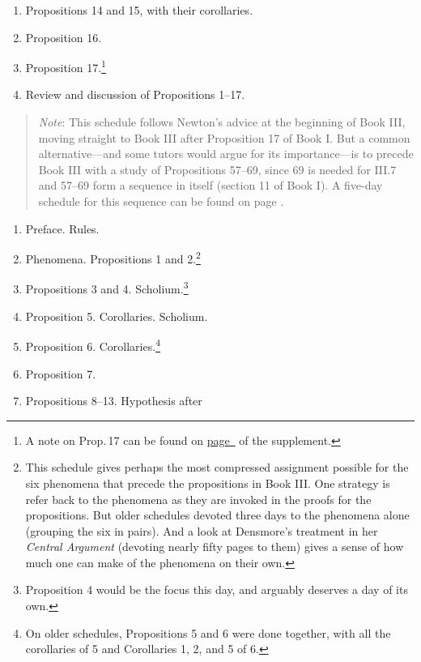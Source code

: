 \documentclass[10pt]{article}
\begin{document}
{\begin{enumerate}[resume*]
{			found on \hyperref[supple.96]{page~\pageref{supple.96}} and \hyperref[supple.98]{\pageref{supple.98}} of the supplement.} \item Propositions
		14 and 15, with their corollaries.  \item
		Proposition 16.  \item Proposition 17.\footnote{A
		note on Prop.\,17 can be found on \hyperref[supple.99]{page~\pageref{supple.99}} of the supplement.}
	\item Review and discussion of Propositions 1--17.
\end{enumerate}
\vspace{-0.5em} 
\begin{quote} \small{\emph{Note}: This
		schedule follows Newton's advice at the
		beginning of Book III, moving straight to
		Book III after Proposition 17 of Book I. But
		a common alternative---and some tutors would
		argue for its importance---is to precede
		Book III with a study of Propositions
		57--69, since 69 is needed for III.7 and
		57--69 form a sequence in itself (section 11
		of Book I). A five-day schedule for this
		sequence can be found on page
		\pageref{Newton}.} \end{quote}
\begin{enumerate}[resume*] \item Preface. Rules.  \item
		Phenomena. Propositions 1 and
		2.\footnote{This schedule gives perhaps the
			most compressed assignment possible
			for the six phenomena that precede
			the propositions in Book III. One
			strategy is refer back to the
			phenomena as they are invoked in the
			proofs for the propositions. But
			older schedules devoted three days
			to the phenomena alone (grouping the
			six in pairs). And a look at
			Densmore's treatment in her
			\emph{Central Argument} (devoting
			nearly fifty pages to them) gives a
			sense of how much one can make of
			the phenomena on their own.}
	\item Propositions 3 and 4. Scholium.\footnote{Proposition 4 would be the focus this day, and arguably deserves a day of its own.}
	\item Proposition 5. Corollaries. Scholium.
	\item Proposition 6. Corollaries.\footnote{On older
			schedules, Propositions 5 and 6 were done
			together, with all the corollaries
			of 5 and Corollaries 1, 2, and 5 of
			6.} 
	\item Proposition 7. 
	\item Propositions 8--13. Hypothesis after

\end{enumerate}}
\end{document}
